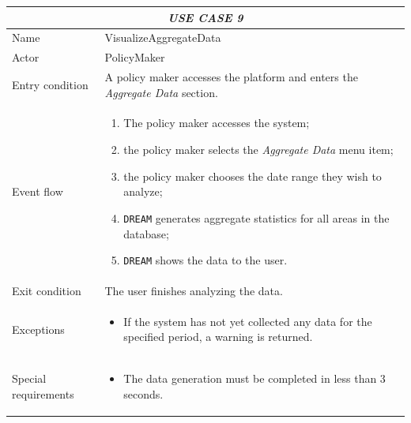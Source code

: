 \documentclass{article}
\begin{document}
\centering
\begin{longtable}{|p{3.5cm}|m{8cm}|}
 \hline
 \multicolumn{2}{|c|}{\cellcolor{white}\emph{USE CASE 9}} \\
 \endfirsthead
 \endhead
 \endfoot
 \endlastfoot
 \hline
 Name & VisualizeAggregateData\\
 \hline
 Actor & PolicyMaker\\
 \hline
 Entry condition & A policy maker accesses the platform and enters the \emph{Aggregate Data} section.\\
 \hline
 Event flow & \begin{enumerate}
    \item The policy maker accesses the system;
    \item the policy maker selects the \emph{Aggregate Data} menu item;
    \item the policy maker chooses the date range they wish to analyze;
    \item \verb|DREAM| generates aggregate statistics for all areas in the database;
    \item \verb|DREAM| shows the data to the user.
 \end{enumerate}\\
 \hline
 Exit condition & The user finishes analyzing the data.\\
 \hline
 Exceptions & \begin{itemize}
     \item If the system has not yet collected any data for the specified period, a warning is returned.
 \end{itemize}\\
 \hline
 Special requirements &\begin{itemize}
     \item The data generation must be completed in less than 3 seconds.
 \end{itemize}\\
 \hline
\end{longtable}
\end{document}
